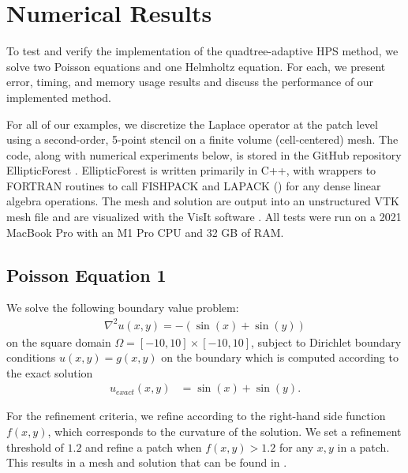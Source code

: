 \section{Numerical Results}
\label{sec:results}

To test and verify the implementation of the quadtree-adaptive HPS method, we solve two Poisson equations and one Helmholtz equation. For each, we present error, timing, and memory usage results and discuss the performance of our implemented method.

For all of our examples, we discretize the Laplace operator at the patch level using a second-order, 5-point stencil on a finite volume (cell-centered) mesh. The code, along with numerical experiments below, is stored in the GitHub repository EllipticForest \cite{chipman2023elliptic}. EllipticForest is written primarily in C++, with wrappers to FORTRAN routines to call FISHPACK and LAPACK (\cite{anderson1999lapack}) for any dense linear algebra operations. The mesh and solution are output into an unstructured VTK mesh file \cite{vtkBook} and are visualized with the VisIt software \cite{HPV:VisIt}. All tests were run on a 2021 MacBook Pro with an M1 Pro CPU and 32 GB of RAM.

\subsection{Poisson Equation 1}
\label{sub:example_one}

We solve the following boundary value problem:
\begin{align}
    \nabla^2 u(x,y) = -(\sin(x) + \sin(y))
\end{align}
on the square domain $\Omega = [-10, 10] \times [-10, 10]$, subject to Dirichlet boundary conditions $u(x,y) = g(x,y)$ on the boundary which is computed according to the exact solution
\begin{align}
    u_{exact}(x,y) &= \sin(x) + \sin(y).
\end{align}

For the refinement criteria, we refine according to the right-hand side function $f(x,y)$, which corresponds to the curvature of the solution. We set a refinement threshold of $1.2$ and refine a patch when $f(x,y) > 1.2$ for any $x,y$ in a patch. This results in a mesh and solution that can be found in .

